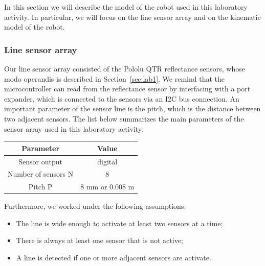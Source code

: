 In this section we will describe the model of the robot used in this laboratory activity. In particular, we will focus on the line sensor array and on the kinematic model of the robot.

\subsubsection{Line sensor array}
Our line sensor array consisted of the Pololu QTR reflectance sensors, whose modo operandis is described in Section~\ref{sec:lab1}. 
We remind that the microcontroller can read from the reflectance sensor by interfacing with a port expander, which is connected to the sensors via an I2C bus connection.
An important parameter of the sensor line is the pitch, which is the distance between two adjacent sensors. The list below summarizes the main parameters of the sensor array used in this laboratory activity:
\begin{table}[H]
    \centering
    \begin{tabular}{cc}
        \toprule
        \textbf{Parameter} & \textbf{Value} \\
        \midrule
        Sensor output & digital \\
        Number of sensors N & 8 \\
        Pitch P & 8 mm or 0.008 m \\
        \bottomrule
    \end{tabular}
\end{table}

Furthermore, we worked under the following assumptions:
\begin{itemize}
    \item The line is wide enough to activate at least two sensors at a time;
    \item There is always at least one sensor that is not active;
    \item A line is detected if one or more adjacent sensors are activate.
\end{itemize}


